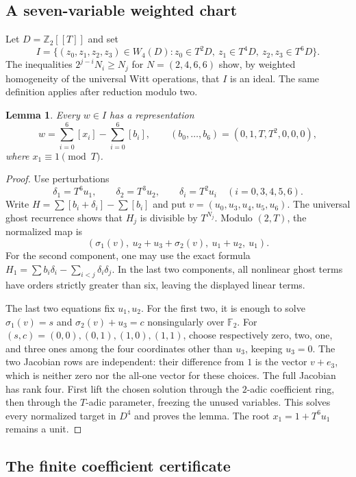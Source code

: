 \documentclass[11pt,reqno]{amsart}
\numberwithin{equation}{section}
\newtheorem{lemma}[theorem]{Lemma}
\theoremstyle{definition}
\begin{document}
\subsection{A seven-variable weighted chart}

Let $D=\mathbb Z_2[[T]]$ and set
\[
 I=\{(z_0,z_1,z_2,z_3)\in W_4(D):
 z_0\in T^2D,\ z_1\in T^4D,\ z_2,z_3\in T^6D\}.
\]
The inequalities $2^{j-i}N_i\ge N_j$ for
$N=(2,4,6,6)$ show, by weighted homogeneity of the universal Witt
operations, that $I$ is an ideal. The same definition applies after
reduction modulo two.

\begin{lemma}\label{lem:eighth-seven-chart}
Every $w\in I$ has a representation
\[
 w=\sum_{i=0}^6[x_i]-\sum_{i=0}^6[b_i],
 \qquad (b_0,\ldots,b_6)=(0,1,T,T^2,0,0,0),
\]
where $x_1\equiv1\pmod{T}$.
\end{lemma}
\begin{proof}
Use perturbations
\[
 \delta_1=T^6u_1,\qquad\delta_2=T^3u_2,\qquad
 \delta_i=T^2u_i\quad(i=0,3,4,5,6).
\]
Write $H=\sum[b_i+\delta_i]-\sum[b_i]$ and put
$v=(u_0,u_3,u_4,u_5,u_6)$. The universal ghost recurrence shows that
$H_j$ is divisible by $T^{N_j}$. Modulo $(2,T)$, the normalized map is
\[
 \left(\sigma_1(v),\ u_2+u_3+\sigma_2(v),\ u_1+u_2,\ u_1\right).
\]
For the second component, one may use the exact formula
$H_1=\sum b_i\delta_i-\sum_{i<j}\delta_i\delta_j$.
In the last two components, all nonlinear ghost terms have orders
strictly greater than six, leaving the displayed linear terms.

The last two equations fix $u_1,u_2$. For the first two, it is enough
to solve $\sigma_1(v)=s$ and $\sigma_2(v)+u_3=c$ nonsingularly
over $\mathbb F_2$. For $(s,c)=(0,0),(0,1),(1,0),(1,1)$, choose
respectively zero, two, one, and three ones among the four coordinates
other than $u_3$, keeping $u_3=0$. The two Jacobian rows are independent:
their difference from $1$ is the vector $v+e_3$, which is neither zero
nor the all-one vector for these choices. The full Jacobian has rank
four. First lift the chosen solution through the $2$-adic coefficient
ring, then through the $T$-adic parameter, freezing the unused variables.
This solves every normalized target in $D^4$ and proves the lemma.
The root $x_1=1+T^6u_1$ remains a unit.
\end{proof}

\subsection{The finite coefficient certificate}
\end{document}
